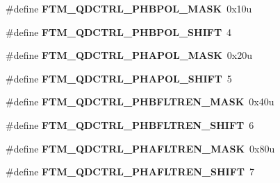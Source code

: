 \begin{DoxyCompactItemize}
\item 
\hypertarget{group___f_t_m___register___masks_ga58a390751189f10795710f0726e42685}{}\#define {\bfseries F\+T\+M\+\_\+\+Q\+D\+C\+T\+R\+L\+\_\+\+P\+H\+B\+P\+O\+L\+\_\+\+M\+A\+S\+K}~0x10u\label{group___f_t_m___register___masks_ga58a390751189f10795710f0726e42685}

\item 
\hypertarget{group___f_t_m___register___masks_gafd01650a0aa5dc97f5a738b70654944e}{}\#define {\bfseries F\+T\+M\+\_\+\+Q\+D\+C\+T\+R\+L\+\_\+\+P\+H\+B\+P\+O\+L\+\_\+\+S\+H\+I\+F\+T}~4\label{group___f_t_m___register___masks_gafd01650a0aa5dc97f5a738b70654944e}

\item 
\hypertarget{group___f_t_m___register___masks_gab8076d97d00af4a3e87a542af63bf45a}{}\#define {\bfseries F\+T\+M\+\_\+\+Q\+D\+C\+T\+R\+L\+\_\+\+P\+H\+A\+P\+O\+L\+\_\+\+M\+A\+S\+K}~0x20u\label{group___f_t_m___register___masks_gab8076d97d00af4a3e87a542af63bf45a}

\item 
\hypertarget{group___f_t_m___register___masks_ga22621810bf1d949ef10f337e826a6649}{}\#define {\bfseries F\+T\+M\+\_\+\+Q\+D\+C\+T\+R\+L\+\_\+\+P\+H\+A\+P\+O\+L\+\_\+\+S\+H\+I\+F\+T}~5\label{group___f_t_m___register___masks_ga22621810bf1d949ef10f337e826a6649}

\item 
\hypertarget{group___f_t_m___register___masks_ga5458826b9d2a62a17c2fca3c13fd45c5}{}\#define {\bfseries F\+T\+M\+\_\+\+Q\+D\+C\+T\+R\+L\+\_\+\+P\+H\+B\+F\+L\+T\+R\+E\+N\+\_\+\+M\+A\+S\+K}~0x40u\label{group___f_t_m___register___masks_ga5458826b9d2a62a17c2fca3c13fd45c5}

\item 
\hypertarget{group___f_t_m___register___masks_gaf6681fd1dc7277fba2da13be8c2a46e7}{}\#define {\bfseries F\+T\+M\+\_\+\+Q\+D\+C\+T\+R\+L\+\_\+\+P\+H\+B\+F\+L\+T\+R\+E\+N\+\_\+\+S\+H\+I\+F\+T}~6\label{group___f_t_m___register___masks_gaf6681fd1dc7277fba2da13be8c2a46e7}

\item 
\hypertarget{group___f_t_m___register___masks_ga1284593b1a9c13205dbbbf5647659049}{}\#define {\bfseries F\+T\+M\+\_\+\+Q\+D\+C\+T\+R\+L\+\_\+\+P\+H\+A\+F\+L\+T\+R\+E\+N\+\_\+\+M\+A\+S\+K}~0x80u\label{group___f_t_m___register___masks_ga1284593b1a9c13205dbbbf5647659049}

\item 
\hypertarget{group___f_t_m___register___masks_ga8d2e6d6756632fdfe6efced044320d48}{}\#define {\bfseries F\+T\+M\+\_\+\+Q\+D\+C\+T\+R\+L\+\_\+\+P\+H\+A\+F\+L\+T\+R\+E\+N\+\_\+\+S\+H\+I\+F\+T}~7\label{group___f_t_m___register___masks_ga8d2e6d6756632fdfe6efced044320d48}


\end{DoxyCompactItemize}
